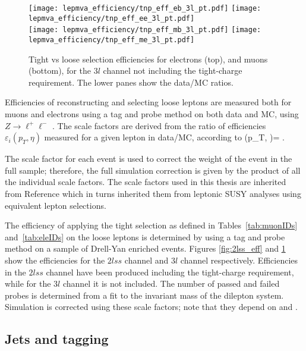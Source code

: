\begin{figure}[!hb]
\centering
  \texttt{[image: lepmva\_efficiency/tnp\_eff\_eb\_3l\_pt.pdf]}
  \texttt{[image: lepmva\_efficiency/tnp\_eff\_ee\_3l\_pt.pdf]}\\
  \texttt{[image: lepmva\_efficiency/tnp\_eff\_mb\_3l\_pt.pdf]}
  \texttt{[image: lepmva\_efficiency/tnp\_eff\_me\_3l\_pt.pdf]}
\caption[Tight vs loose lepton selection efficiencies in the $3l$ channel.]{Tight vs loose selection efficiencies for electrons (top), and muons (bottom), for the $3l$ channel not including the tight-charge requirement. The lower panes show the data/MC ratios.}
\label{fig:3l_eff}
\end{figure}

Efficiencies of reconstructing and selecting loose leptons are measured both for muons and electrons using a tag and probe method on both data and MC, using $Z\rightarrow\ell^{+}\ell^{-}$ \cite{tnp}. The scale factors are derived from the ratio of efficiencies $\varepsilon_{i}(p_T, \eta)$ measured for a given lepton in data/MC, according to 
\beqn
\rho(p_T, \eta)= .
\eeqn

The scale factor for each event is used to correct the weight of the event in the full sample; therefore, the full simulation correction is given by the product of all the individual scale factors. The scale factors used in this thesis are inherited from Reference \cite{CMS_AN_2017-029} which in turns inherited them from leptonic SUSY analyses using equivalent lepton selections.

The efficiency of applying the tight selection as defined in Tables~\ref{tab:muonIDs} and~\ref{tab:eleIDs} on the loose leptons is determined by using a tag and probe method on a sample of Drell-Yan enriched events. Figures \ref{fig:2lss_eff} and \ref{fig:3l_eff} show the efficiencies for the $2lss$ channel and $3l$ channel respectively. Efficiencies in the $2lss$ channel have been produced including the tight-charge requirement, while for the $3l$ channel it is not included. The number of passed and failed probes is determined from a fit to the invariant mass of the dilepton system. Simulation is corrected using these scale factors; note that they depend on \etac and \pt.   

\subsection{Jets and \bjet tagging}


